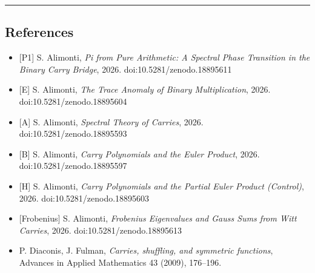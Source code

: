 \documentclass[
  11pt,
]{article}
\providecommand{\tightlist}{%
  \setlength{\itemsep}{0pt}\setlength{\parskip}{0pt}}
\begin{document}
\begin{center}\rule{0.5\linewidth}{0.5pt}\end{center}

\newpage

\subsection{References}\label{references}

\begin{itemize}
\tightlist
\item
  {[}P1{]} S. Alimonti, \emph{Pi from Pure Arithmetic: A Spectral Phase
  Transition in the Binary Carry Bridge}, 2026. doi:10.5281/zenodo.18895611
\item
  {[}E{]} S. Alimonti, \emph{The Trace Anomaly of Binary Multiplication}, 2026.
  doi:10.5281/zenodo.18895604
\item
  {[}A{]} S. Alimonti, \emph{Spectral Theory of Carries}, 2026.
  doi:10.5281/zenodo.18895593
\item
  {[}B{]} S. Alimonti, \emph{Carry Polynomials and the Euler Product}, 2026.
  doi:10.5281/zenodo.18895597
\item
  {[}H{]} S. Alimonti, \emph{Carry Polynomials and the Partial Euler Product
  (Control)}, 2026. doi:10.5281/zenodo.18895603
\item
  {[}Frobenius{]} S. Alimonti, \emph{Frobenius Eigenvalues and Gauss Sums from
  Witt Carries}, 2026. doi:10.5281/zenodo.18895613
\item
  P. Diaconis, J. Fulman, \emph{Carries, shuffling, and symmetric functions},
  Advances in Applied Mathematics 43 (2009), 176--196.
\end{itemize}
\end{document}
